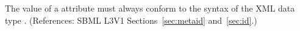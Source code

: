 The value of a  attribute must always conform to the syntax
of the XML data type .  (References: SBML L3V1
Sections~\ref{sec:metaid} and~\ref{sec:id}.)
